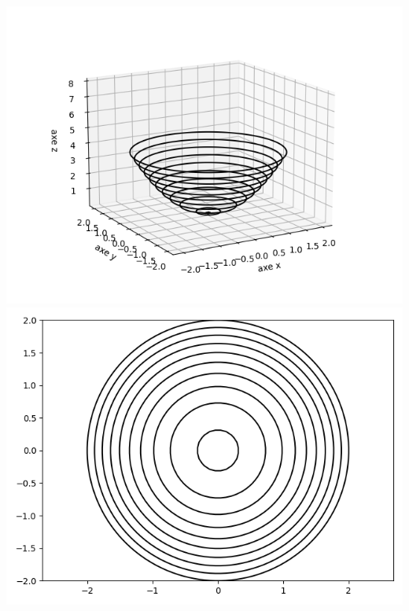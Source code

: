 \documentclass[11pt, class=report,crop=false]{standalone}
\begin{document}
\begin{exemple}
\begin{center}
\includegraphics[scale=\myscale,scale=0.5]{figures/fonctions-extrem-1d}
\includegraphics[scale=\myscale,scale=0.5]{figures/fonctions-extrem-1e}
\end{center}


\end{exemple}
	
\end{document}
